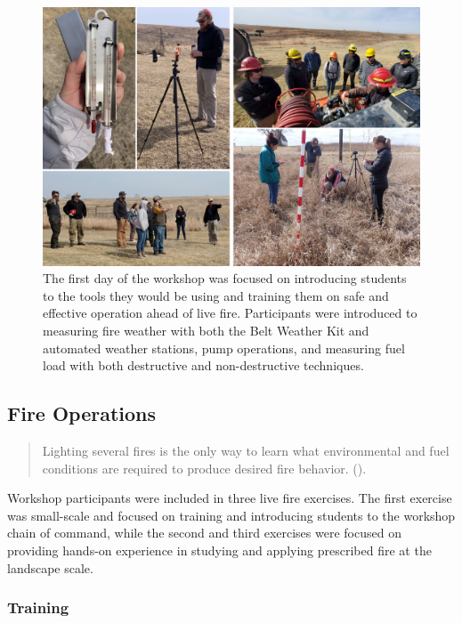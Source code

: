 \documentclass[fire,casereport,accept,moreauthors,pdftex]{Definitions/mdpi}  %
\begin{document}
\begin{figure}[H]
\includegraphics[width=1\columnwidth]{TrainingDay.pdf}
\caption{The first day of the workshop was focused on introducing students to the tools they would be using and training them on safe and effective operation ahead of live fire. Participants were introduced to measuring fire weather with both the Belt Weather Kit and automated weather stations, pump operations, and measuring fuel load with both destructive and non-destructive techniques.}\label{TrainingDay}
\end{figure}

\subsection{Fire Operations}

\begin{quote}
Lighting several fires is the only way to learn what environmental and fuel conditions are required to produce desired fire behavior. (\citet{mcpherson1986}).
\end{quote}

Workshop participants were included in three live fire exercises.
The first exercise was small-scale and focused on training and introducing students to the workshop chain of command, while the second and third exercises were focused on providing hands-on experience in studying and applying prescribed fire at the landscape scale.

\subsubsection{Training}
\end{document}

